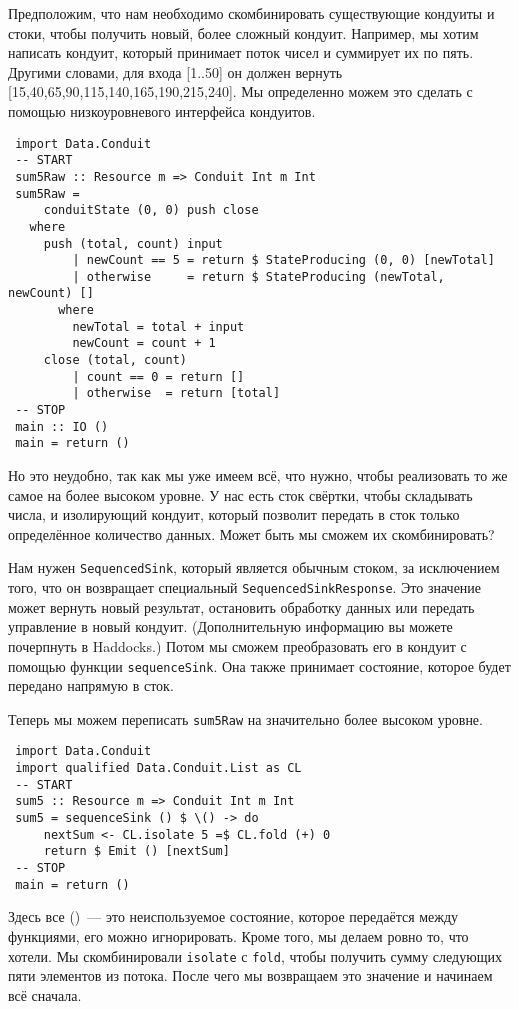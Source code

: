 Предположим, что нам необходимо скомбинировать существующие кондуиты  и  стоки, 
чтобы получить новый, более сложный кондуит. Например, мы хотим написать кондуит, 
который принимает поток чисел и суммирует их по пять. Другими словами, для входа 
[1..50] он должен вернуть [15,40,65,90,115,140,165,190,215,240]. Мы определенно 
можем это сделать с помощью низкоуровневого интерфейса кондуитов.
\begin{lstlisting}
 import Data.Conduit
 -- START
 sum5Raw :: Resource m => Conduit Int m Int
 sum5Raw =
     conduitState (0, 0) push close
   where
     push (total, count) input
         | newCount == 5 = return $ StateProducing (0, 0) [newTotal]
         | otherwise     = return $ StateProducing (newTotal, newCount) []
       where
         newTotal = total + input
         newCount = count + 1
     close (total, count)
         | count == 0 = return []
         | otherwise  = return [total]
 -- STOP
 main :: IO ()
 main = return ()
\end{lstlisting}
Но это неудобно, так как мы уже имеем всё, что нужно, чтобы реализовать то же самое 
на более высоком уровне. У нас есть сток свёртки, чтобы складывать числа, и изолирующий 
кондуит, который позволит передать в сток только определённое количество данных. 
Может быть мы сможем их скомбинировать?
 
Нам нужен \lstinline'SequencedSink', который является обычным стоком, за исключением 
того, что он возвращает специальный \lstinline'SequencedSinkResponse'. Это 
значение может вернуть новый результат, остановить обработку данных или передать 
управление в новый кондуит. (Дополнительную информацию вы можете почерпнуть 
в Haddocks.) Потом мы сможем преобразовать его в кондуит с помощью функции 
\lstinline'sequenceSink'. Она также принимает состояние, которое будет 
передано напрямую в сток.
 
Теперь мы можем переписать \lstinline'sum5Raw' на значительно более высоком уровне.
\begin{lstlisting}
 import Data.Conduit
 import qualified Data.Conduit.List as CL
 -- START
 sum5 :: Resource m => Conduit Int m Int
 sum5 = sequenceSink () $ \() -> do
     nextSum <- CL.isolate 5 =$ CL.fold (+) 0
     return $ Emit () [nextSum]
 -- STOP
 main = return ()
\end{lstlisting}
Здесь все ()~--- это  неиспользуемое состояние, которое передаётся между функциями,
его можно игнорировать.
Кроме того, мы делаем ровно то, что хотели. Мы скомбинировали 
\lstinline{isolate} с \lstinline{fold}, чтобы получить сумму следующих пяти
элементов из потока. После чего мы возвращаем это значение и начинаем всё сначала.
 
